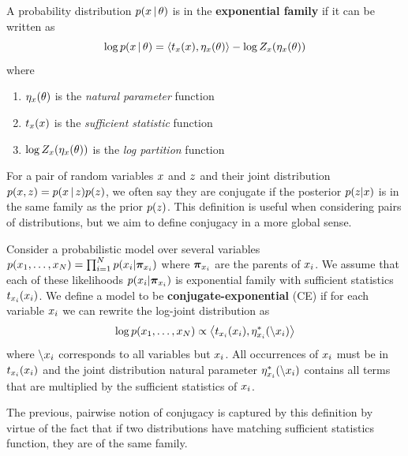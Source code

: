 \begin{definition}
A probability distribution $p(x \,|\, \theta)$ is in the \textbf{exponential family}
if it can be written as
\begin{equation}
    \log p(x \,|\, \theta) = \left\langle t_x(x),\eta_x(\theta)\right\rangle - \log Z_x(\eta_x(\theta))
\end{equation}
where
\begin{enumerate}
    \item $\eta_x(\theta)$ is the \emph{natural parameter} function
    \item $t_x(x)$ is the \emph{sufficient statistic} function
    \item $\log Z_x(\eta_x(\theta))$ is the \emph{log partition} function
\end{enumerate}
\end{definition}


For a pair of random variables $x$ and $z$ and their
joint distribution $p(x, z) = p(x \,|\, z)p(z)$, we often say
they are conjugate if the posterior $p(z|x)$ is in the same
family as the prior $p(z)$. This definition
is useful when considering pairs of distributions,
but we aim to define conjugacy in a more global sense.

\begin{definition}
\label{def:conjugacy}
Consider a probabilistic model over several variables $p(x_1, \ldots, x_N) = \prod_{i = 1}^N p(x_i | \bm{\pi}_{x_i})$ where $\bm{\pi}_{x_i}$ are the parents of $x_i$.
We assume that each of these likelihoods $p(x_i | \bm{\pi}_{x_i})$
is exponential family with sufficient statistics $t_{x_i}(x_i)$.
We define a model to be \textbf{conjugate-exponential} (CE)
if for each variable $x_i$ we can rewrite
the log-joint distribution as
\begin{equation}\label{eq:natparam}
    \log p(x_1, \ldots, x_N) \propto \left\langle t_{x_i}(x_i), \eta^*_{x_i}(\backslash x_i)\right\rangle
\end{equation}
where $\backslash x_i$ corresponds to all variables but $x_i$.
All occurrences of $x_i$ must be in $t_{x_i}(x_i)$ and the
joint distribution natural parameter $\eta^*_{x_i}(\backslash x_i)$
contains all terms that are multiplied by the sufficient statistics of $x_i$.
\end{definition}
The previous, pairwise notion of conjugacy is captured by this definition 
by virtue of the fact that if two distributions
have matching sufficient statistics function, they are of the same family.

